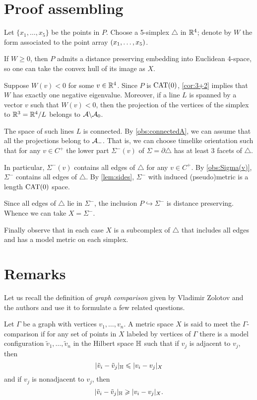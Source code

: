 \documentclass{article}
\begin{document}
\section{Proof assembling}

Let $\{x_1,\dots,x_5\}$ be the points in $P$.
Choose a 5-simplex $\triangle$ in $\mathbb{R}^4$; denote by $W$ the form associated to the point array $(x_1,\z\dots,x_5)$.

If $W\ge0$, then $P$ admits a distance preserving embedding into Euclidean 4-space, so one can take the convex hull of its image as $X$.

Suppose $W(v)<0$ for some $v\in\mathbb{R}^4$.
Since $P$ is $\mathrm{CAT}(0)$, \ref{cor:3+2} implies that $W$ has exactly one negative eigenvalue.
Moreover, if a line $L$ is spanned by a vector $v$ such that $W(v)<0$, then the projection of the vertices of the simplex to $\mathbb{R}^3=\mathbb{R}^4/L$ belongs to $\mathcal{A}\backslash\mathcal{A}_0$.

The space of such lines $L$ is connected.
By \ref{obs:connectedA}, we can assume that all the projections belong to $\mathcal{A}_-$.
That is, we can choose timelike orientation such that for any $v\in C^+$ the lower part $\Sigma^-(v)$ of $\Sigma=\partial \triangle$ has at least 3 facets of $\triangle$.

In particular, $\Sigma^-(v)$ contains all edges of $\triangle$ for any $v\in C^+$.
By \ref{obs:Sigma(v)}, $\Sigma^-$ contains all edges of $\triangle$.
By \ref{lem:sides}, $\Sigma^-$ with induced (pseudo)metric is a length $\mathrm{CAT}(0)$ space.

Since all edges of $\triangle$ lie in $\Sigma^-$, the inclusion $P\hookrightarrow \Sigma^-$ is distance preserving.
Whence we can take $X=\Sigma^-$.

Finally observe that in each case $X$ is a subcomplex of $\triangle$ that includes all edges and has a model metric on each simplex.
\qeds

\section{Remarks}

Let us recall the definition of \emph{graph comparison} given by Vladimir Zolotov and the authors \cite{lebedeva-petrunin-zolotov} and use it to formulate a few related questions.

Let $\Gamma$ be a graph with vertices $v_1,\dots,v_n$.
A metric space $X$ is said to meet the $\Gamma$-comparison if for any set of points in $X$ labeled by vertices of $\Gamma$ there is a model configuration $\tilde v_1,\dots,\tilde v_n$ in the Hilbert space $\mathbb H$ such that 
if $v_j$ is adjacent to $v_j$, then
\[|\tilde v_i-\tilde v_j|_{\mathbb H}\leqslant | v_i-v_j|_{X}\]
and
if $v_j$ is nonadjacent to $v_j$, then
\[|\tilde v_i-\tilde v_j|_{\mathbb H}\geqslant | v_i-v_j|_{X}.\]
\end{document}
